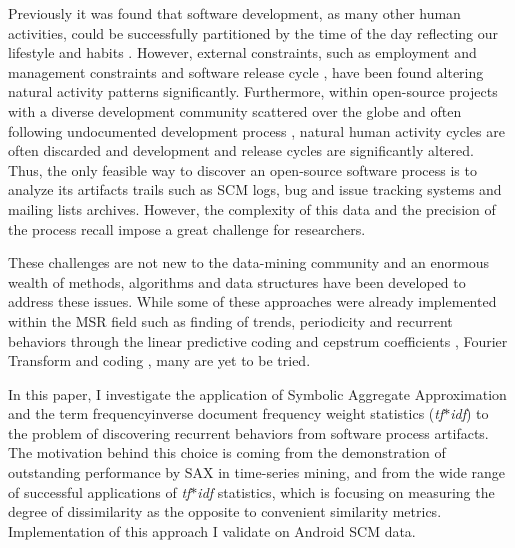 \documentclass[conference]{worldcomp}
\begin{document}
Previously it was found that software development, as many other human activities,
could be successfully partitioned by the time of the day reflecting our lifestyle and habits
\cite{citeulike:10396459} \cite{citeulike:10392305}. However, external constraints, 
such as employment and management constraints \cite{citeulike:6095797} and
software release cycle \cite{citeulike:2739216},  have been found altering 
natural activity patterns significantly. Furthermore, within open-source 
projects with a diverse development community scattered over the globe and 
often following undocumented development process \cite{citeulike:10377366}, natural human 
activity cycles are often discarded and development and release cycles are significantly altered.
Thus, the only feasible way to discover an open-source software process is to analyze 
its artifacts trails such as SCM logs, bug and issue tracking systems and 
mailing lists archives. However, the complexity of this data and the precision 
of the process recall impose a great challenge for researchers.

These challenges are not new to the data-mining community and an enormous wealth 
of methods, algorithms and data structures have been developed to address these issues.
While some of these approaches were already implemented within the MSR field \cite{citeulike:7853299}  
such as finding of trends, periodicity and recurrent behaviors through the linear 
predictive coding and cepstrum coefficients \cite{citeulike:3378725}, 
Fourier Transform \cite{citeulike:10377345} and coding \cite{citeulike:10377366},
many are yet to be tried.

In this paper, I investigate the application of 
Symbolic Aggregate Approximation \cite{citeulike:2821475} and the 
term frequency\textendash inverse document frequency weight statistics (\textit{tf$\ast$idf})
\cite{citeulike:3056638} to the problem of discovering recurrent 
behaviors from software process artifacts. The motivation behind this choice is coming
from the demonstration of outstanding performance by SAX in time-series mining, 
and from the wide range of successful applications of \textit{tf$\ast$idf} 
statistics, which is focusing on measuring the degree of dissimilarity 
as the opposite to convenient similarity metrics. Implementation of this approach I 
validate on Android SCM data.
\end{document}

